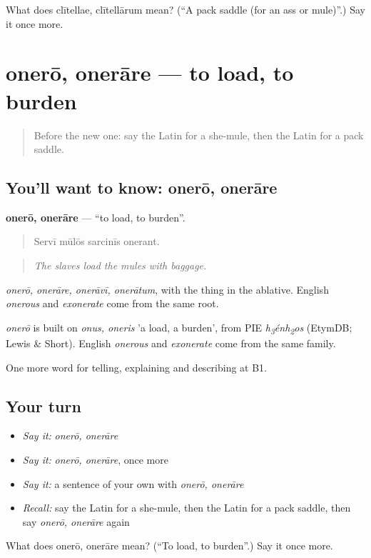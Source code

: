 \begin{tcolorbox}[breakable,colback=teal!4,colframe=teal!35!black,title={Before you move on}]
What does clītellae, clītellārum mean? (\textquotedblleft{}A pack saddle (for an ass or mule)\textquotedblright{}.) Say it once more.
\end{tcolorbox}
\section[onerō, onerāre]{onerō, onerāre — to load, to burden}

\label{lesson:LA-C433-onero}



\begin{quote}
Before the new one: say the Latin for a she-mule, then the Latin for a pack saddle.
\end{quote}

\subsection*{You'll want to know: onerō, onerāre}
\textbf{onerō, onerāre} — \textquotedblleft{}to load, to burden\textquotedblright{}.

\begin{quote}
Servī mūlōs sarcinīs onerant.
\end{quote}

\begin{quote}
\emph{The slaves load the mules with baggage.}
\end{quote}

\emph{onerō, onerāre, onerāvī, onerātum}, with the thing in the ablative. English \emph{onerous} and \emph{exonerate} come from the same root.

\begin{cousinweb}
\emph{onerō} is built on \emph{onus, oneris} 'a load, a burden', from PIE \emph{h\textsubscript{3}énh\textsubscript{2}os} (EtymDB; Lewis \& Short). English \emph{onerous} and \emph{exonerate} come from the same family.
\end{cousinweb}

\begin{grammarlens}[title={What you've built}]
One more word for telling, explaining and describing at B1.
\end{grammarlens}

\subsection*{Your turn}
\begin{itemize}
\raggedright
  \item \emph{Say it:} \emph{onerō, onerāre}
  \item \emph{Say it:} \emph{onerō, onerāre}, once more
  \item \emph{Say it:} a sentence of your own with \emph{onerō, onerāre}
  \item \emph{Recall:} say the Latin for a she-mule, then the Latin for a pack saddle, then say \emph{onerō, onerāre} again
\end{itemize}

\begin{tcolorbox}[breakable,colback=teal!4,colframe=teal!35!black,title={Before you move on}]
What does onerō, onerāre mean? (\textquotedblleft{}To load, to burden\textquotedblright{}.) Say it once more.
\end{tcolorbox}
